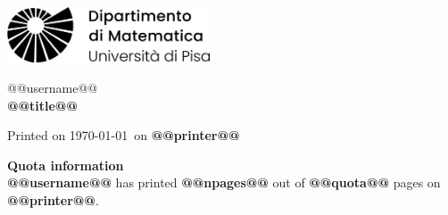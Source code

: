 \documentclass[a4paper]{article}
\begin{document}
    \thispagestyle{empty}
    \sffamily

    \hfill \includegraphics[width=6cm]{banner-logo}
    \vspace{3cm}
    \begin{center}
        \Huge
        @@username@@ \\[2cm]
        \textbf{@@title@@} \\[4cm]     
    \end{center}

    \Large
    \noindent Printed on \today\ on \textbf{@@printer@@} \\[2cm]

    \vfill

    \noindent \textbf{Quota information} \\[.05cm]
    \noindent \textbf{@@username@@} has printed 
    \textbf{@@npages@@} out of \textbf{@@quota@@}
    pages on \textbf{@@printer@@}.
\end{document}
